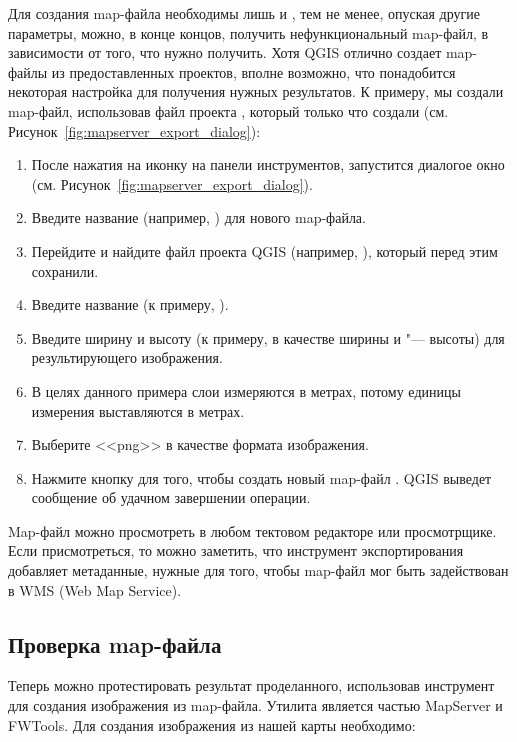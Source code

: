 Для создания map-файла необходимы лишь  и
, тем не менее, опуская другие параметры,
можно, в конце концов, получить нефункциональный map-файл, в зависимости
от того, что нужно получить. Хотя QGIS отлично создает map-файлы из
предоставленных проектов, вполне возможно, что понадобится некоторая
настройка для получения нужных результатов. К примеру, мы создали
map-файл, использовав файл проекта ,
который только что создали (см. Рисунок~\ref{fig:mapserver_export_dialog}):

\begin{enumerate}
  \item После нажатия на иконку 
  на панели инструментов, запустится диалогое окно (см. Рисунок~\ref{fig:mapserver_export_dialog}).
  \item Введите название (например, ) для
  нового map-файла.
  \item Перейдите и найдите файл проекта QGIS
  (например, ), который перед этим
  сохранили.
  \item Введите название (к примеру, ).
  \item Введите ширину и высоту (к примеру,  в качестве
  ширины и  "--- высоты) для результирующего изображения.
  \item В целях данного примера слои измеряются в метрах, потому единицы
  измерения выставляются в метрах.
  \item Выберите <<png>> в качестве формата изображения.
  \item Нажмите кнопку  для того, чтобы создать новый
  map-файл . QGIS выведет сообщение об
  удачном завершении операции.
\end{enumerate}

Map-файл можно просмотреть в любом тектовом редакторе или просмотрщике.
Если присмотреться, то можно заметить, что инструмент экспортирования
добавляет метаданные, нужные для того, чтобы map-файл мог быть
задействован в WMS (Web Map Service).

\subsection{Проверка map-файла}

Теперь можно протестировать результат проделанного, использовав
инструмент  для создания изображения из map-файла.
Утилита  является частью MapServer и FWTools. Для
создания изображения из нашей карты необходимо:

